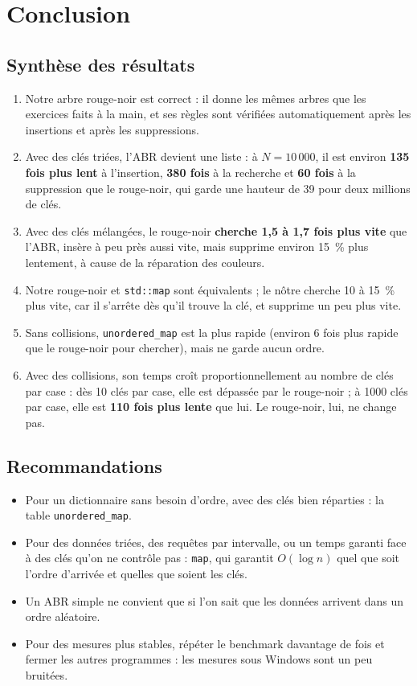 \documentclass[12pt,a4paper]{report}
\begin{document}
\chapter{Conclusion}

\section{Synthèse des résultats}
\begin{enumerate}
  \item Notre arbre rouge-noir est correct : il donne les mêmes arbres que les exercices faits à la main, et ses règles sont vérifiées automatiquement après les insertions et après les suppressions.
  \item Avec des clés triées, l'ABR devient une liste : à $N = 10\,000$, il est environ \textbf{135 fois plus lent} à l'insertion, \textbf{380 fois} à la recherche et \textbf{60 fois} à la suppression que le rouge-noir, qui garde une hauteur de 39 pour deux millions de clés.
  \item Avec des clés mélangées, le rouge-noir \textbf{cherche 1,5 à 1,7 fois plus vite} que l'ABR, insère à peu près aussi vite, mais supprime environ 15~\% plus lentement, à cause de la réparation des couleurs.
  \item Notre rouge-noir et \texttt{std::map} sont équivalents ; le nôtre cherche 10 à 15~\% plus vite, car il s'arrête dès qu'il trouve la clé, et supprime un peu plus vite.
  \item Sans collisions, \texttt{unordered\_map} est la plus rapide (environ 6 fois plus rapide que le rouge-noir pour chercher), mais ne garde aucun ordre.
  \item Avec des collisions, son temps croît proportionnellement au nombre de clés par case : dès 10 clés par case, elle est dépassée par le rouge-noir ; à 1000 clés par case, elle est \textbf{110 fois plus lente} que lui. Le rouge-noir, lui, ne change pas.
\end{enumerate}

\section{Recommandations}
\begin{itemize}
  \item Pour un dictionnaire sans besoin d'ordre, avec des clés bien réparties : la table \texttt{unordered\_map}.
  \item Pour des données triées, des requêtes par intervalle, ou un temps garanti face à des clés qu'on ne contrôle pas : \texttt{map}, qui garantit $O(\log n)$ quel que soit l'ordre d'arrivée et quelles que soient les clés.
  \item Un ABR simple ne convient que si l'on sait que les données arrivent dans un ordre aléatoire.
  \item Pour des mesures plus stables, répéter le benchmark davantage de fois et fermer les autres programmes : les mesures sous Windows sont un peu bruitées.
\end{itemize}
\end{document}
